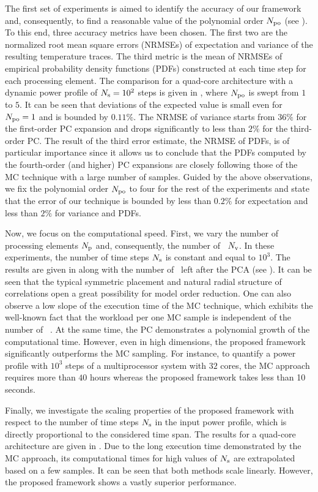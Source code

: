 
The first set of experiments is aimed to identify the accuracy of our framework and, consequently, to find a reasonable value of the polynomial order ${N_\text{po}}$ (see ). To this end, three accuracy metrics have been chosen. The first two are the normalized root mean square errors (NRMSEs) of expectation and variance of the resulting temperature traces. The third metric is the mean of NRMSEs of empirical probability density functions (PDFs) constructed at each time step for each processing element. The comparison for a quad-core architecture with a dynamic power profile of $N_\text{s} = 10^2$ steps is given in , where ${N_\text{po}}$ is swept from $1$ to $5$. It can be seen that deviations of the expected value is small even for ${N_\text{po}} = 1$ and is bounded by $0.11\%$. The NRMSE of variance starts from $36\%$ for the first-order PC expansion and drops significantly to less than $2\%$ for the third-order PC. The result of the third error estimate, the NRMSE of PDFs, is of particular importance since it allows us to conclude that the PDFs computed by the fourth-order (and higher) PC expansions are closely following those of the MC technique with a large number of samples. Guided by the above observations, we fix the polynomial order ${N_\text{po}}$ to four for the rest of the experiments and state that the error of our technique is bounded by less than $0.2\%$ for expectation and less than $2\%$ for variance and PDFs.


Now, we focus on the computational speed. First, we vary the number of processing elements ${N_\text{p}}$ and, consequently, the number of \rvs\ ${N_\text{v}}$. In these experiments, the number of time steps $N_\text{s}$ is constant and equal to $10^3$. The results are given in  along with the number of \rvs\ left after the PCA (see ). It can be seen that the typical symmetric placement and natural radial structure of correlations \cite{cheng2011} open a great possibility for model order reduction. One can also observe a low slope of the execution time of the MC technique, which exhibits the well-known fact that the workload per one MC sample is independent of the number of \rvs\  \cite{maitre2010}. At the same time, the PC demonstrates a polynomial growth \cite{heiss2008} of the computational time. However, even in high dimensions, the proposed framework significantly outperforms the MC sampling. For instance, to quantify a power profile with $10^3$ steps of a multiprocessor system with $32$ cores, the MC approach requires more than $40$ hours whereas the proposed framework takes less than 10 seconds.

Finally, we investigate the scaling properties of the proposed framework with respect to the number of time steps $N_\text{s}$ in the input power profile, which is directly proportional to the considered time span. The results for a quad-core architecture are given in . Due to the long execution time demonstrated by the MC approach, its computational times for high values of $N_\text{s}$ are extrapolated based on a few samples. It can be seen that both methods scale linearly. However, the proposed framework shows a vastly superior performance.

